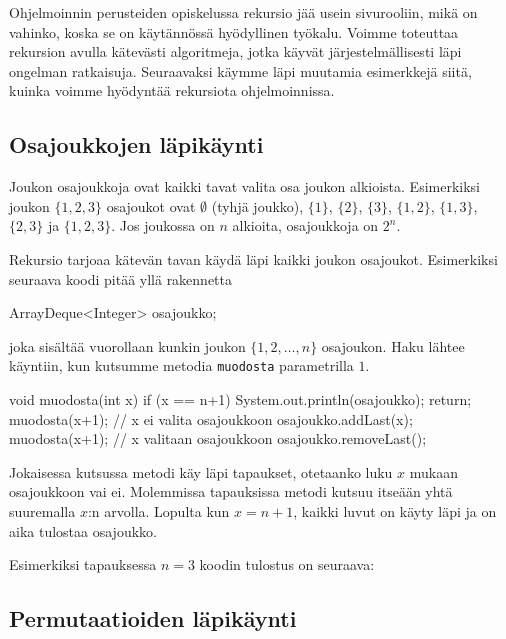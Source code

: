 Ohjelmoinnin perusteiden opiskelussa rekursio jää usein sivurooliin,
mikä on vahinko, koska se on käytännössä hyödyllinen työkalu.
Voimme toteuttaa rekursion avulla kätevästi algoritmeja,
jotka käyvät järjestelmällisesti läpi ongelman ratkaisuja.
Seuraavaksi käymme läpi muutamia esimerkkejä siitä,
kuinka voimme hyödyntää rekursiota ohjelmoinnissa.

\subsection{Osajoukkojen läpikäynti}

Joukon osajoukkoja ovat kaikki tavat valita osa joukon alkioista.
Esimerkiksi joukon $\{1,2,3\}$ osajoukot ovat
$\emptyset$ (tyhjä joukko), $\{1\}$, $\{2\}$, $\{3\}$,
$\{1,2\}$, $\{1,3\}$, $\{2,3\}$ ja $\{1,2,3\}$.
Jos joukossa on $n$ alkioita, osajoukkoja on $2^n$.

Rekursio tarjoaa kätevän tavan käydä läpi kaikki
joukon osajoukot. Esimerkiksi seuraava koodi pitää yllä
rakennetta

\begin{code}
ArrayDeque<Integer> osajoukko;
\end{code}

joka sisältää vuorollaan kunkin joukon $\{1,2,\dots,n\}$
osajoukon.
Haku läh\-tee käyntiin, kun kutsumme metodia \texttt{muodosta}
parametrilla $1$.

\begin{code}
void muodosta(int x) {
    if (x == n+1) {
        System.out.println(osajoukko);
        return;
    }
    muodosta(x+1); // x ei valita osajoukkoon
    osajoukko.addLast(x);
    muodosta(x+1); // x valitaan osajoukkoon
    osajoukko.removeLast();
}
\end{code}

Jokaisessa kutsussa metodi käy läpi tapaukset,
otetaanko luku $x$ mukaan osajoukkoon vai ei.
Molemmissa tapauksissa metodi kutsuu itseään yhtä
suuremalla $x$:n arvolla.
Lopulta kun $x=n+1$, kaikki luvut on käyty läpi
ja on aika tulostaa osajoukko.

Esimerkiksi tapauksessa $n=3$ koodin tulostus on seuraava:

\begin{code}
[]
[3]
[2]
[2, 3]
[1]
[1, 3]
[1, 2]
[1, 2, 3]
\end{code}

\subsection{Permutaatioiden läpikäynti}

